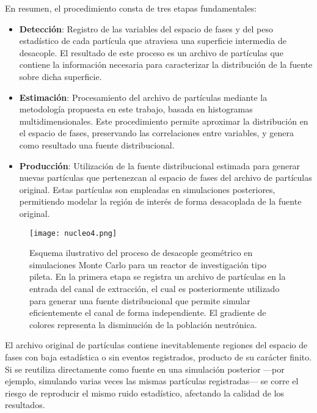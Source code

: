 En resumen, el procedimiento consta de tres etapas fundamentales:

\begin{itemize}
    \item \textbf{Detección}: Registro de las variables del espacio de fases y del peso estadístico de cada partícula que atraviesa una superficie intermedia de desacople. El resultado de este proceso es un archivo de partículas que contiene la información necesaria para caracterizar la distribución de la fuente sobre dicha superficie.

    \item \textbf{Estimación}: Procesamiento del archivo de partículas mediante la metodología propuesta en este trabajo, basada en histogramas multidimensionales. Este procedimiento permite aproximar la distribución en el espacio de fases, preservando las correlaciones entre variables, y genera como resultado una fuente distribucional.

    \item \textbf{Producción}: Utilización de la fuente distribucional estimada para generar nuevas partículas que pertenezcan al espacio de fases del archivo de partículas original. Estas partículas son empleadas en simulaciones posteriores, permitiendo modelar la región de interés de forma desacoplada de la fuente original.
\end{itemize}

\begin{figure}[H]
    \centering
    \texttt{[image: nucleo4.png]}
    \caption{Esquema ilustrativo del proceso de desacople geométrico en simulaciones Monte Carlo para un reactor de investigación tipo pileta. En la primera etapa se registra un archivo de partículas en la entrada del canal de extracción, el cual es posteriormente utilizado para generar una fuente distribucional que permite simular eficientemente el canal de forma independiente. El gradiente de colores representa la disminución de la población neutrónica.}
    \label{fig:nucleo4}
\end{figure}

El archivo original de partículas contiene inevitablemente regiones del espacio de fases con baja estadística o sin eventos registrados, producto de su carácter finito. Si se reutiliza directamente como fuente en una simulación posterior —por ejemplo, simulando varias veces las mismas partículas registradas— se corre el riesgo de reproducir el mismo ruido estadístico, afectando la calidad de los resultados.


